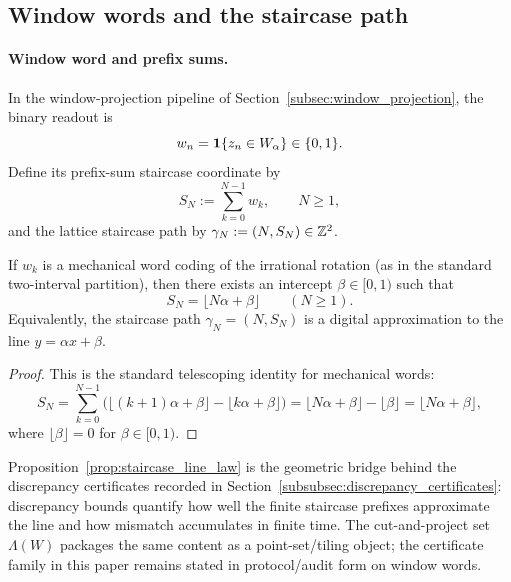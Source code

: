 \subsection{Window words and the staircase path}
\label{subsec:staircase_prefix_sum}

\paragraph{Window word and prefix sums.}
\MathTag In the window-projection pipeline of Section~\ref{subsec:window_projection}, the binary readout is
\[
w_n=\mathbf{1}\{z_n\in W_\alpha\}\in\{0,1\}.
\]
Define its prefix-sum staircase coordinate by
\[
S_N:=\sum_{k=0}^{N-1} w_k,\qquad N\ge 1,
\]
and the lattice staircase path by $\gamma_N:=(N,S_N)\in\mathbb{Z}^2$.

\begin{proposition}
\label{prop:staircase_line_law}
\MathTag If $w_k$ is a mechanical word coding of the irrational rotation (as in the standard two-interval partition), then there exists an intercept $\beta\in[0,1)$ such that
\[
S_N=\lfloor N\alpha+\beta\rfloor \qquad (N\ge 1).
\]
Equivalently, the staircase path $\gamma_N=(N,S_N)$ is a digital approximation to the line $y=\alpha x+\beta$.
\end{proposition}

\begin{proof}
This is the standard telescoping identity for mechanical words:
\[
S_N=\sum_{k=0}^{N-1}\Big(\lfloor (k+1)\alpha+\beta\rfloor-\lfloor k\alpha+\beta\rfloor\Big)
=\lfloor N\alpha+\beta\rfloor-\lfloor\beta\rfloor
=\lfloor N\alpha+\beta\rfloor,
\]
where $\lfloor\beta\rfloor=0$ for $\beta\in[0,1)$.
\end{proof}

\begin{remark}
\AuditTag Proposition~\ref{prop:staircase_line_law} is the geometric bridge behind the discrepancy certificates recorded in Section~\ref{subsubsec:discrepancy_certificates}:
discrepancy bounds quantify how well the finite staircase prefixes approximate the line and how mismatch accumulates in finite time.
The cut-and-project set $\Lambda(W)$ packages the same content as a point-set/tiling object; the certificate family in this paper remains stated in protocol/audit form on window words.
\end{remark}

